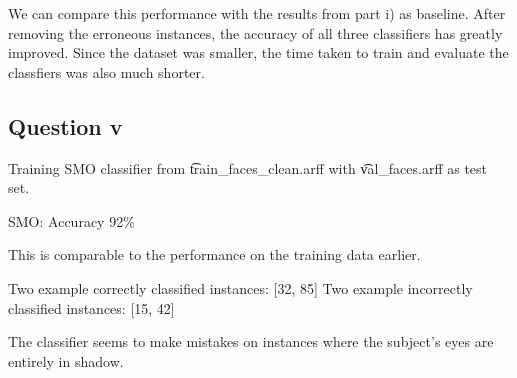 \documentclass[a4paper]{article}
\begin{document}
We can compare this performance with the results from part i) as baseline. After removing the erroneous instances, the accuracy of all three classifiers has greatly improved. Since the dataset was smaller, the time taken to train and evaluate the classfiers was also much shorter.

\subsection*{Question v}
Training SMO classifier from \t{train_faces_clean.arff} with \t{val_faces.arff} as test set.

SMO: Accuracy 92\%

This is comparable to the performance on the training data earlier.

Two example correctly classified instances: [32, 85]
Two example incorrectly classified instances: [15, 42]

The classifier seems to make mistakes on instances where the subject's eyes are entirely in shadow.
\end{document}
